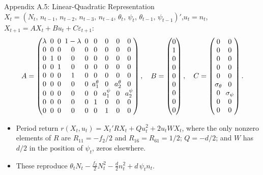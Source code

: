 \documentclass[10pt]{beamer}
\begin{document}
\begin{frame}{Appendix A.5: Linear-Quadratic Representation}
  \footnotesize
  $X_t=(N_t,\,n_{t-1},\,n_{t-2},\,n_{t-3},\,n_{t-4},\,\theta_t,\,\psi_t,\,\theta_{t-1},\,\psi_{t-1})'$,\quad $u_t=n_t$,\quad
  $X_{t+1}=AX_t+Bu_t+C\varepsilon_{t+1}$:
  \[
  \setlength{\arraycolsep}{2.6pt}
  A=\begin{pmatrix}
    \lambda&0&0&1-\lambda&0&0&0&0&0\\
    0&0&0&0&0&0&0&0&0\\
    0&1&0&0&0&0&0&0&0\\
    0&0&1&0&0&0&0&0&0\\
    0&0&0&1&0&0&0&0&0\\
    0&0&0&0&0&a_1^\theta&0&a_2^\theta&0\\
    0&0&0&0&0&0&a_1^\psi&0&a_2^\psi\\
    0&0&0&0&0&1&0&0&0\\
    0&0&0&0&0&0&1&0&0
  \end{pmatrix},\quad
  B=\begin{pmatrix}0\\1\\0\\0\\0\\0\\0\\0\\0\end{pmatrix},\quad
  C=\begin{pmatrix}0&0\\0&0\\0&0\\0&0\\0&0\\\sigma_\theta&0\\0&\sigma_\psi\\0&0\\0&0\end{pmatrix}.
  \]
  \begin{itemize}
    \item Period return $r(X_t,u_t)=X_t'RX_t+Qu_t^2+2u_tWX_t$, where the only nonzero elements of $R$ are $R_{11}=-f_2/2$ and $R_{16}=R_{61}=1/2$; $Q=-d/2$; and $W$ has $d/2$ in the position of $\psi_t$, zeros elsewhere.
    \item These reproduce $\theta_tN_t-\tfrac{f_2}{2}N_t^2-\tfrac d2n_t^2+d\,\psi_tn_t$.
  \end{itemize}
\end{frame}
\end{document}
